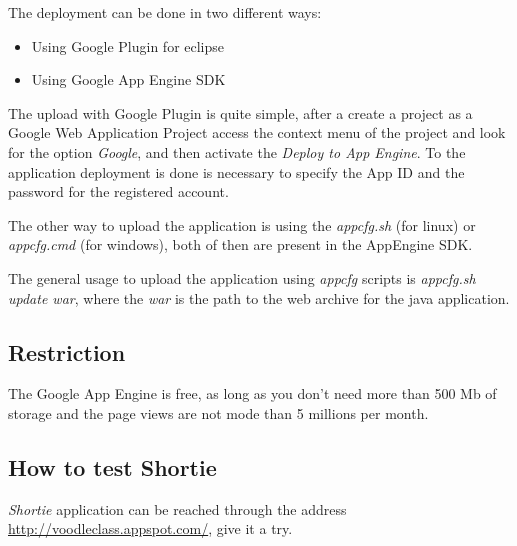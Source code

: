\documentclass{article}
\begin{document}
The deployment can be done in two different ways:

\begin{itemize}
\item Using Google Plugin for eclipse
\item Using Google App Engine SDK
\end{itemize}

The upload with Google Plugin is quite simple, after a create a project as a Google Web Application Project access the context menu of the project and look for the option \emph{Google}, and then activate the \emph{Deploy to App Engine}. To the application deployment is done is necessary to specify the App ID and the password for the registered account.

The other way to upload the application is using the \emph{appcfg.sh} (for linux) or \emph{appcfg.cmd} (for windows), both of then are present in the AppEngine SDK. 

The general usage to upload the application using \emph{appcfg}  scripts is \emph{appcfg.sh update war}, where the \emph{war} is the path to the web archive for the java application.

\subsection{Restriction}

The Google App Engine is free, as long as you don't need more than 500 Mb of storage and the page views are not mode than 5 millions per month.

\subsection{How to test Shortie}

\emph{Shortie} application can be reached through the address \url{http://voodleclass.appspot.com/}, give it a try.
\end{document}
